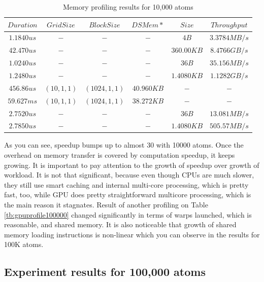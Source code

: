 \documentclass[12pt,letterpaper]{report}
\begin{document}
\begin{table}[h!]
	\renewcommand*{\arraystretch}{1.5}
	\tabcolsep=0.12cm
  \centering
  \begin{tabular}{| c | c | c | c | c | c |}
   \hline
   
$Duration $ & $ Grid Size $ & $ Block Size $ & $ DSMem* $ & $ Size $ & $ Throughput  $ \\ \hline
$1.1840us $ & $ - $ & $ - $ & $ - $ & $ 4B $ & $ 3.3784MB/s  $ \\ \hline
$42.470us $ & $ - $ & $ - $ & $ - $ & $ 360.00KB $ & $ 8.4766GB/s  $ \\ \hline
$1.0240us $ & $ - $ & $ - $ & $ - $ & $ 36B $ & $ 35.156MB/s  $ \\ \hline
$1.2480us $ & $ - $ & $ - $ & $ - $ & $ 1.4080KB $ & $ 1.1282GB/s  $ \\ \hline
$456.86us $ & $ (10,1,1) $ & $ (1024,1,1) $ & $ 40.960KB $ & $ - $ & $ -  $ \\ \hline
$59.627ms $ & $ (10,1,1) $ & $ (1024,1,1) $ & $ 38.272KB $ & $ - $ & $ -  $ \\ \hline
$2.7520us $ & $ - $ & $ - $ & $ - $ & $ 36B $ & $ 13.081MB/s  $ \\ \hline
$2.7850us $ & $ - $ & $ - $ & $ - $ & $ 1.4080KB $ & $ 505.57MB/s$ \\ 

	\hline

  \end{tabular}
    \caption{Memory profiling results for 10,000 atoms}
    	  \label{tb:gpumem10000}
\end{table}


As you can see, speedup bumps up to almost 30 with 10000 atoms. Once the overhead on memory transfer is covered by computation speedup, it keeps growing. It is important to pay attention to the growth of speedup over growth of workload. It is not that significant, because even though CPUs are much slower, they still use smart caching and internal multi-core processing, which is pretty fast, too, while GPU does pretty straightforward multicore processing, which is the main reason it stagnates.
Result of another profiling on Table \ref{tb:gpuprofile100000} changed significantly in terms of warps launched, which is reasonable, and shared memory. It is also noticeable that growth of shared memory loading instructions is non-linear which you can observe in the results for 100K atoms.

\subsection{Experiment results for 100,000 atoms}
\end{document}
